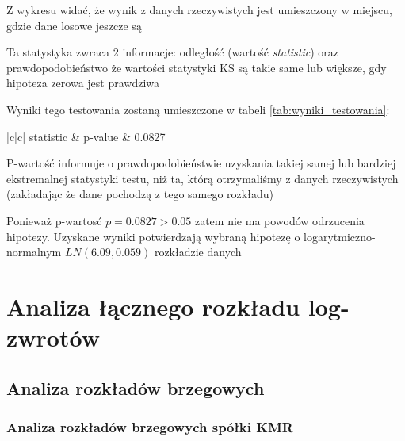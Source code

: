 \documentclass[a4paper,11pt]{article}
\def\\{\hfill\break}
\begin{document}
Z wykresu widać, że wynik z danych rzeczywistych jest umieszczony w miejscu, gdzie dane losowe jeszcze są



Ta statystyka zwraca 2 informacje: odległość (wartość \textit{statistic}) oraz prawdopodobieństwo że wartości statystyki KS są takie same lub większe, gdy hipoteza zerowa jest prawdziwa

Wyniki tego testowania zostaną umieszczone w tabeli \ref{tab:wyniki_testowania}:

\begin{table}[!htb]
  \centering
  \begin{tabular}{|c|c|}
    \hline
     statistic & p-value   \\
      & 0.0827\\
    \hline
  \end{tabular}
  \caption{Wartość statystyki KS w testowaniu hipotezy}
  \label{tab:wyniki_testowania}
\end{table}


P-wartość informuje o prawdopodobieństwie uzyskania takiej samej lub bardziej ekstremalnej statystyki testu, niż ta, którą otrzymaliśmy z danych rzeczywistych (zakładając że dane pochodzą z tego samego rozkładu)

Ponieważ p-wartosć  $p = 0.0827 > 0.05$ zatem nie ma powodów odrzucenia hipotezy. Uzyskane wyniki potwierdzają wybraną hipotezę  o logarytmiczno-normalnym $LN(6.09, 0.059)$ rozkładzie danych

\newpage

\pagebreak
\section{Analiza łącznego rozkładu log-zwrotów}
\subsection{Analiza rozkładów brzegowych}
\subsubsection{Analiza rozkładów brzegowych spółki KMR}
\end{document}
